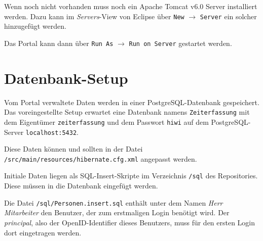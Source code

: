\documentclass[article,colorback,accentcolor=tud2c]{tudreport}
\begin{document}
Wenn noch nicht vorhanden muss noch ein Apache Tomcat v6.0 Server installiert werden. Dazu kann im \emph{Servers}-View von Eclipse über \texttt{New} $\rightarrow$ \texttt{Server} ein solcher hinzugefügt werden.

Das Portal kann dann über \texttt{Run As} $\rightarrow$ \texttt{Run on Server} gestartet werden.


\section{Datenbank-Setup} %
\label{sec:datenbank_setup}

Vom Portal verwaltete Daten werden in einer PostgreSQL-Datenbank gespeichert. Das voreingestellte Setup erwartet eine Datenbank namens \texttt{Zeiterfassung} mit dem Eigentümer \texttt{zeiterfassung} und dem Passwort \texttt{hiwi} auf dem PostgreSQL-Server \texttt{localhost:5432}.

Diese Daten können und sollten in der Datei \texttt{/src/main/resources/hibernate.cfg.xml} angepasst werden.

Initiale Daten liegen als SQL-Insert-Skripte im Verzeichnis \texttt{/sql} des Repositories. Diese müssen in die Datenbank eingefügt werden.

Die Datei \texttt{/sql/Personen.insert.sql} enthält unter dem Namen \emph{Herr Mitarbeiter} den Benutzer, der zum erstmaligen Login benötigt wird. Der \emph{principal}, also der OpenID-Identifier dieses Benutzers, muss für den ersten Login dort eingetragen werden.

\end{document}
